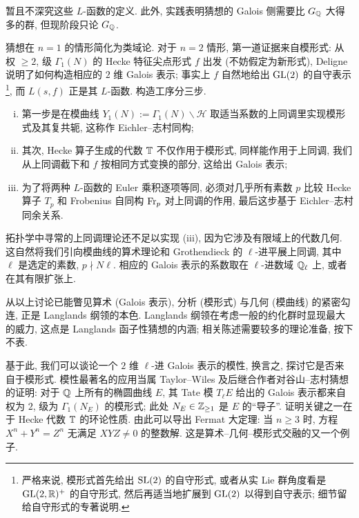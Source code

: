 暂且不深究这些 $L$-函数的定义. 此外, 实践表明猜想的 Galois 侧需要比 $G_{\mathbb{Q}}$ 大得多的群, 但现阶段只论 $G_{\mathbb{Q}}$.

猜想在 $n=1$ 的情形简化为类域论. 对于 $n=2$ 情形, 第一道证据来自模形式: 从权 $\geq 2$, 级 $\Gamma_1(N)$ 的 Hecke 特征尖点形式 $f$ 出发 (不妨假定为新形式), Deligne 说明了如何构造相应的 $2$ 维 Galois 表示; 事实上 $f$ 自然地给出 $\operatorname{GL}(2)$ 的自守表示\footnote{严格来说, 模形式首先给出 $\operatorname{SL}(2)$ 的自守形式, 或者从实 Lie 群角度看是 $\operatorname{GL}(2, \mathbb{R})^+$ 的自守形式, 然后再适当地扩展到 $\operatorname{GL}(2)$ 以得到自守表示; 细节留给自守形式的专著说明.}, 而 $L(s, f)$ 正是其 $L$-函数. 构造工序分三步.
\begin{enumerate}[(i)]
	\item 第一步是在模曲线 $Y_1(N) := \Gamma_1(N) \backslash \mathcal{H}$ 取适当系数的上同调里实现模形式及其复共轭, 这称作 Eichler--志村同构;
	\item 其次, Hecke 算子生成的代数 $\mathbb{T}$ 不仅作用于模形式, 同样能作用于上同调, 我们从上同调截下和 $f$ 按相同方式变换的部分, 这给出 Galois 表示;
	\item 为了将两种 $L$-函数的 Euler 乘积逐项等同, 必须对几乎所有素数 $p$ 比较 Hecke 算子 $T_p$ 和 Frobenius 自同构 $\operatorname{Fr}_p$ 对上同调的作用, 最后这步基于 Eichler--志村同余关系.
\end{enumerate}
拓扑学中寻常的上同调理论还不足以实现 (iii), 因为它涉及有限域上的代数几何. 这自然将我们引向模曲线的算术理论和 Grothendieck 的 $\ell$-进平展上同调, 其中 $\ell$ 是选定的素数, $p \nmid N\ell$. 相应的 Galois 表示的系数取在 $\ell$-进数域 $\mathbb{Q}_\ell$ 上, 或者在其有限扩张上.

从以上讨论已能瞥见算术 (Galois 表示), 分析 (模形式) 与几何 (模曲线) 的紧密勾连, 正是 Langlands 纲领的本色. Langlands 纲领在考虑一般的约化群时显现最大的威力, 这点是 Langlands 函子性猜想的内涵; 相关陈述需要较多的理论准备, 按下不表.

基于此, 我们可以谈论一个 $2$ 维 $\ell$-进 Galois 表示的模性, 换言之, 探讨它是否来自于模形式. 模性最著名的应用当属 Taylor--Wiles 及后继合作者对谷山--志村猜想的证明: 对于 $\mathbb{Q}$ 上所有的椭圆曲线 $E$, 其 Tate 模 $T_\ell E$ 给出的 Galois 表示都来自权为 $2$, 级为 $\Gamma_1(N_E)$ 的模形式; 此处 $N_E \in \mathbb{Z}_{\geq 1}$ 是 $E$ 的``导子''. 证明关键之一在于 Hecke 代数 $\mathbb{T}$ 的环论性质. 由此可以导出 Fermat 大定理: 当 $n \geq 3$ 时, 方程 $X^n + Y^n = Z^n$ 无满足 $XYZ \neq 0$ 的整数解. 这是算术--几何--模形式交融的又一个例子.

